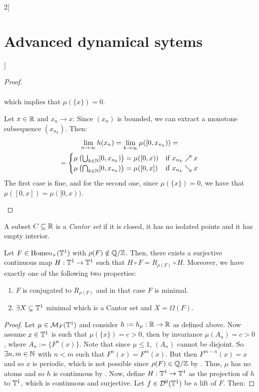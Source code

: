 \documentclass[../../../main_math.tex]{subfiles}
\begin{document}
\begin{multicols}{2}[\section{Advanced dynamical sytems}]
\begin{proof}
\begin{itemizeiff}
\begin{multline*}
      \end{multline*}
      which implies that $\mu(\{x\})=0$.
      \item Let $x\in\mathbb{R}$ and $x_n\to x$. Since $(x_n)$ is bounded, we can extract a monotone subsequence $(x_{n_k})$. Then:
      \begin{multline*}
        \lim_{n\to \infty}h(x_n)=\lim_{k\to \infty}\mu([0,x_{n_k}))=\\
        =\begin{cases}
          \mu\left(\bigcup_{k\in\mathbb{N}}[0,x_{n_k})\right) = \mu([0,x)) & \text{if } x_{n_k}\nearrow x \\
          \mu\left(\bigcap_{k\in\mathbb{N}}[0,x_{n_k})\right) = \mu([0,x]) & \text{if } x_{n_k}\searrow x
        \end{cases}
      \end{multline*}
      The first case is fine, and for the second one, since $\mu(\{x\})=0$, we have that $\mu([0,x])=\mu([0,x))$.
    \end{itemizeiff}
  \end{proof}
  \begin{definition}
    A subset $C\subseteq \mathbb{R}$ is a \emph{Cantor set} if it is closed, it has no isolated points and it has empty interior.
  \end{definition}
  \begin{theorem}\label{ADS:theorem_irrational_rotation_number}
    Let $F\in\mathrm{Homeo}_+(\mathbb{T}^1)$ with $\rho(F)\notin\quot{\QQ}{\ZZ}$. Then, there exists a surjective continuous map $H:\mathbb{T}^1\to \mathbb{T}^1$ such that $H\circ F=R_{\rho(F)}\circ H$. Moreover, we have exactly one of the following two properties:
    \begin{enumerate}
      \item $F$ is conjugated to $R_{\rho(F)}$ and in that case $F$ is minimal.
      \item $\exists X\subsetneq \mathbb{T}^1$ minimal which is a Cantor set and $X=\Omega(F)$.
    \end{enumerate}
  \end{theorem}
  \begin{proof}
    Let $\mu\in\mathcal{M}_F(\mathbb{T}^1)$ and consider $h:=h_\mu:\mathbb{R}\to\mathbb{R}$ as defined above. Now assume $x\in \mathbb{T}^1$ is such that $\mu(\{x\})=c>0$, then by invariance $\mu(A_n)=c>0$, where $A_n:=\{F^n(x)\}$. Note that since $\mu\leq 1$, $(A_n)$ cannot be disjoint. So $\exists n,m\in\mathbb{N}$ with $n<m$ such that $F^n(x)=F^m(x)$. But then $F^{m-n}(x)=x$ and so $x$ is periodic, which is not possible since $\rho(F)\in\quot{\QQ}{\ZZ}$ by . Thus, $\mu$ has no atoms and so $h$ is continuous by . Now, define $H:\mathbb{T}^1\to \mathbb{T}^1$ as the projection of $h$ to $\mathbb{T}^1$, which is continuous and surjective. Let $f\in\mathcal{D}^0(\mathbb{T}^1)$ be a lift of $F$. Then:

\end{proof}
\end{multicols}
\end{document}
